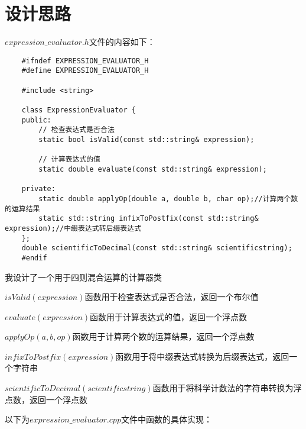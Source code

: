 \documentclass[UTF8]{ctexart}
\begin{document}
\pagestyle{fancy}
\fancyhead{}

\section{设计思路}
$expression\_evaluator.h$文件的内容如下：
\begin{lstlisting}
    #ifndef EXPRESSION_EVALUATOR_H
    #define EXPRESSION_EVALUATOR_H
    
    #include <string>
    
    class ExpressionEvaluator {
    public:
        // 检查表达式是否合法
        static bool isValid(const std::string& expression);
    
        // 计算表达式的值
        static double evaluate(const std::string& expression);
    
    private:
        static double applyOp(double a, double b, char op);//计算两个数的运算结果
        static std::string infixToPostfix(const std::string& expression);//中缀表达式转后缀表达式
    };
    double scientificToDecimal(const std::string& scientificstring);
    #endif
\end{lstlisting}\par
我设计了一个用于四则混合运算的计算器类\par
$isValid(expression)$函数用于检查表达式是否合法，返回一个布尔值\par
$evaluate(expression)$函数用于计算表达式的值，返回一个浮点数\par
$applyOp(a, b, op)$函数用于计算两个数的运算结果，返回一个浮点数\par
$infixToPostfix(expression)$函数用于将中缀表达式转换为后缀表达式，返回一个字符串\par
$scientificToDecimal(scientificstring)$函数用于将科学计数法的字符串转换为浮点数，返回一个浮点数\par
以下为$expression\_evaluator.cpp$文件中函数的具体实现：
\end{document}

